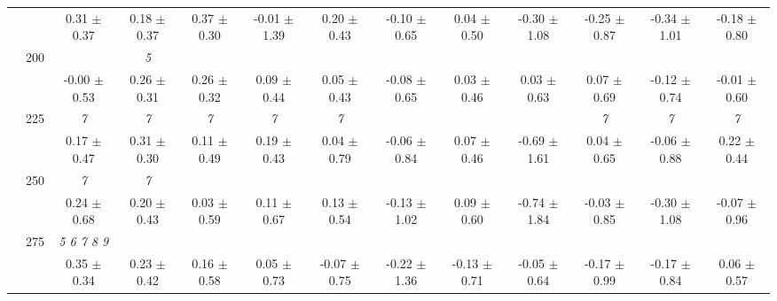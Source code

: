 \begin{table}[h]
{\begin{tabular}{
        ccccccccccccc}
 & & \cellcolor[HTML]{EFEFEF} 0.31 $\pm$ 0.37& \cellcolor[HTML]{EFEFEF} 0.18 $\pm$ 0.37& \cellcolor[HTML]{EFEFEF} 0.37 $\pm$ 0.30& \cellcolor[HTML]{EFEFEF} -0.01 $\pm$ 1.39& \cellcolor[HTML]{EFEFEF} 0.20 $\pm$ 0.43& \cellcolor[HTML]{EFEFEF} -0.10 $\pm$ 0.65& \cellcolor[HTML]{EFEFEF} 0.04 $\pm$ 0.50& \cellcolor[HTML]{EFEFEF} -0.30 $\pm$ 1.08& \cellcolor[HTML]{EFEFEF} -0.25 $\pm$ 0.87& \cellcolor[HTML]{EFEFEF} -0.34 $\pm$ 1.01& \cellcolor[HTML]{EFEFEF} -0.18 $\pm$ 0.80 \\ 
 & \multirow{2}{*}{200}& & \textit{ 5 }& & & & & & & & &  \\ 
 & & -0.00 $\pm$ 0.53& 0.26 $\pm$ 0.31& 0.26 $\pm$ 0.32& 0.09 $\pm$ 0.44& 0.05 $\pm$ 0.43& -0.08 $\pm$ 0.65& 0.03 $\pm$ 0.46& 0.03 $\pm$ 0.63& 0.07 $\pm$ 0.69& -0.12 $\pm$ 0.74& -0.01 $\pm$ 0.60 \\ 
 & \multirow{2}{*}{225}& \cellcolor[HTML]{EFEFEF} \textit{ 7 }& \cellcolor[HTML]{EFEFEF} \textit{ 7 }& \cellcolor[HTML]{EFEFEF} \textit{ 7 }& \cellcolor[HTML]{EFEFEF} \textit{ 7 }& \cellcolor[HTML]{EFEFEF} \textit{ 7 }& \cellcolor[HTML]{EFEFEF} & \cellcolor[HTML]{EFEFEF} & \cellcolor[HTML]{EFEFEF} & \cellcolor[HTML]{EFEFEF} \textit{ 7 }& \cellcolor[HTML]{EFEFEF} \textit{ 7 }& \cellcolor[HTML]{EFEFEF} \textit{ 7 } \\ 
 & & \cellcolor[HTML]{EFEFEF} 0.17 $\pm$ 0.47& \cellcolor[HTML]{EFEFEF} 0.31 $\pm$ 0.30& \cellcolor[HTML]{EFEFEF} 0.11 $\pm$ 0.49& \cellcolor[HTML]{EFEFEF} 0.19 $\pm$ 0.43& \cellcolor[HTML]{EFEFEF} 0.04 $\pm$ 0.79& \cellcolor[HTML]{EFEFEF} -0.06 $\pm$ 0.84& \cellcolor[HTML]{EFEFEF} 0.07 $\pm$ 0.46& \cellcolor[HTML]{EFEFEF} -0.69 $\pm$ 1.61& \cellcolor[HTML]{EFEFEF} 0.04 $\pm$ 0.65& \cellcolor[HTML]{EFEFEF} -0.06 $\pm$ 0.88& \cellcolor[HTML]{EFEFEF} 0.22 $\pm$ 0.44 \\ 
 & \multirow{2}{*}{250}& \textit{ 7 }& \textit{ 7 }& & & & & & & & &  \\ 
 & & 0.24 $\pm$ 0.68& 0.20 $\pm$ 0.43& 0.03 $\pm$ 0.59& 0.11 $\pm$ 0.67& 0.13 $\pm$ 0.54& -0.13 $\pm$ 1.02& 0.09 $\pm$ 0.60& -0.74 $\pm$ 1.84& -0.03 $\pm$ 0.85& -0.30 $\pm$ 1.08& -0.07 $\pm$ 0.96 \\ 
 & \multirow{2}{*}{275}& \cellcolor[HTML]{EFEFEF} \textit{ 5 6 7 8 9 }& \cellcolor[HTML]{EFEFEF} & \cellcolor[HTML]{EFEFEF} & \cellcolor[HTML]{EFEFEF} & \cellcolor[HTML]{EFEFEF} & \cellcolor[HTML]{EFEFEF} & \cellcolor[HTML]{EFEFEF} & \cellcolor[HTML]{EFEFEF} & \cellcolor[HTML]{EFEFEF} & \cellcolor[HTML]{EFEFEF} & \cellcolor[HTML]{EFEFEF}  \\ 
 & & \cellcolor[HTML]{EFEFEF} 0.35 $\pm$ 0.34& \cellcolor[HTML]{EFEFEF} 0.23 $\pm$ 0.42& \cellcolor[HTML]{EFEFEF} 0.16 $\pm$ 0.58& \cellcolor[HTML]{EFEFEF} 0.05 $\pm$ 0.73& \cellcolor[HTML]{EFEFEF} -0.07 $\pm$ 0.75& \cellcolor[HTML]{EFEFEF} -0.22 $\pm$ 1.36& \cellcolor[HTML]{EFEFEF} -0.13 $\pm$ 0.71& \cellcolor[HTML]{EFEFEF} -0.05 $\pm$ 0.64& \cellcolor[HTML]{EFEFEF} -0.17 $\pm$ 0.99& \cellcolor[HTML]{EFEFEF} -0.17 $\pm$ 0.84& \cellcolor[HTML]{EFEFEF} 0.06 $\pm$ 0.57 \\ 

\end{tabular}}
\end{table}
